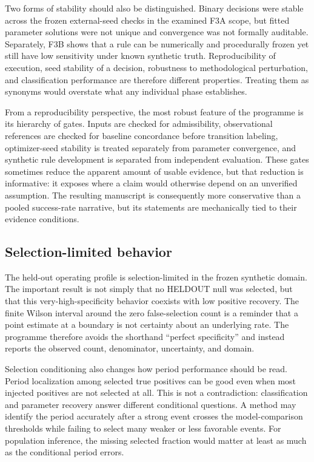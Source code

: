 \documentclass[11pt,a4paper]{article}
\begin{document}
Two forms of stability should also be distinguished. Binary decisions were stable across the frozen external-seed checks in the examined F3A scope, but fitted parameter solutions were not unique and convergence was not formally auditable. Separately, F3B shows that a rule can be numerically and procedurally frozen yet still have low sensitivity under known synthetic truth. Reproducibility of execution, seed stability of a decision, robustness to methodological perturbation, and classification performance are therefore different properties. Treating them as synonyms would overstate what any individual phase establishes.

From a reproducibility perspective, the most robust feature of the programme is its hierarchy of gates. Inputs are checked for admissibility, observational references are checked for baseline concordance before transition labeling, optimizer-seed stability is treated separately from parameter convergence, and synthetic rule development is separated from independent evaluation. These gates sometimes reduce the apparent amount of usable evidence, but that reduction is informative: it exposes where a claim would otherwise depend on an unverified assumption. The resulting manuscript is consequently more conservative than a pooled success-rate narrative, but its statements are mechanically tied to their evidence conditions.

\subsection{Selection-limited behavior}
The held-out operating profile is selection-limited in the frozen synthetic domain. The important result is not simply that no HELDOUT null was selected, but that this very-high-specificity behavior coexists with low positive recovery. The finite Wilson interval around the zero false-selection count is a reminder that a point estimate at a boundary is not certainty about an underlying rate. The programme therefore avoids the shorthand ``perfect specificity'' and instead reports the observed count, denominator, uncertainty, and domain.

Selection conditioning also changes how period performance should be read. Period localization among selected true positives can be good even when most injected positives are not selected at all. This is not a contradiction: classification and parameter recovery answer different conditional questions. A method may identify the period accurately after a strong event crosses the model-comparison thresholds while failing to select many weaker or less favorable events. For population inference, the missing selected fraction would matter at least as much as the conditional period errors.
\end{document}

